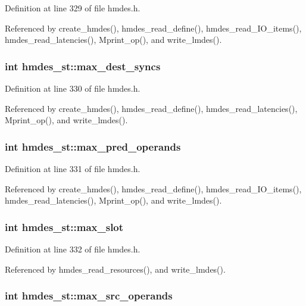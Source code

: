 Definition at line 329 of file hmdes.h.

Referenced by create\_\-hmdes(), hmdes\_\-read\_\-define(), hmdes\_\-read\_\-IO\_\-items(), hmdes\_\-read\_\-latencies(), Mprint\_\-op(), and write\_\-lmdes().
\subsubsection{\setlength{\rightskip}{0pt plus 5cm}int \bf{hmdes\_\-st::max\_\-dest\_\-syncs}}\label{structhmdes__st_fd6e7b12c8fd77bc052c69715ba2e9c2}




Definition at line 330 of file hmdes.h.

Referenced by create\_\-hmdes(), hmdes\_\-read\_\-define(), hmdes\_\-read\_\-latencies(), Mprint\_\-op(), and write\_\-lmdes().
\subsubsection{\setlength{\rightskip}{0pt plus 5cm}int \bf{hmdes\_\-st::max\_\-pred\_\-operands}}\label{structhmdes__st_d1234881901cd6f69caf80f4238f874f}




Definition at line 331 of file hmdes.h.

Referenced by create\_\-hmdes(), hmdes\_\-read\_\-define(), hmdes\_\-read\_\-IO\_\-items(), hmdes\_\-read\_\-latencies(), Mprint\_\-op(), and write\_\-lmdes().
\subsubsection{\setlength{\rightskip}{0pt plus 5cm}int \bf{hmdes\_\-st::max\_\-slot}}\label{structhmdes__st_edec89f9ab36ec4d87f60111d14cb645}




Definition at line 332 of file hmdes.h.

Referenced by hmdes\_\-read\_\-resources(), and write\_\-lmdes().
\subsubsection{\setlength{\rightskip}{0pt plus 5cm}int \bf{hmdes\_\-st::max\_\-src\_\-operands}}\label{structhmdes__st_d13b429ef4ce57f85b6e50cfc7e89ba4}




